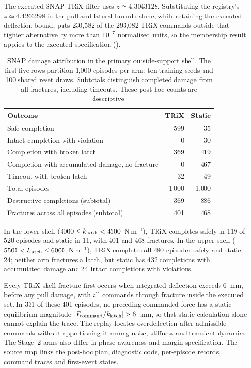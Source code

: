 \documentclass[10pt]{article}
\let\suppsection\suppname
\begin{document}
The executed SNAP TRiX filter uses $z\simeq4.3043128$. Substituting the
registry's $z\simeq4.4266298$ in the pull and lateral bounds alone, while
retaining the executed deflection bound, puts 230,582 of the 293,082 TRiX
commands outside that tighter alternative by more than $10^{-7}$ normalized
units, so the membership result applies to the executed specification (\suppsection{S5.7}).

\begin{table}[!htbp]
\centering\small
\caption{SNAP damage attribution in the primary outside-support shell.
The first five rows partition 1,000 episodes per arm: ten training seeds
and 100 shared reset draws. Subtotals distinguish completed damage from
all fractures, including timeouts. These post-hoc counts are descriptive.}
\label{tab:snap-ood-attribution}
\begin{tabular}{@{}lrr@{}}
\toprule Outcome & TRiX & Static\\
\midrule
Safe completion & 599 & 35\\
Intact completion with violation & 0 & 30\\
Completion with broken latch & 369 & 419\\
Completion with accumulated damage, no fracture & 0 & 467\\
Timeout with broken latch & 32 & 49\\
\midrule
Total episodes & 1,000 & 1,000\\
\midrule
Destructive completions (subtotal) & 369 & 886\\
Fractures across all episodes (subtotal) & 401 & 468\\
\bottomrule
\end{tabular}
\end{table}

In the lower shell ($4000\leq k_{\rm latch}<4500$~N\,m$^{-1}$), TRiX completes
safely in 119 of 520 episodes and static in 11, with 401 and 468 fractures.
In the upper shell ($5500<k_{\rm latch}\leq6000$~N\,m$^{-1}$),
TRiX completes all 480 episodes safely and static 24; neither arm
fractures a latch, but static has 432 completions with accumulated damage and
24 intact completions with violations.

Every TRiX shell fracture first occurs when integrated deflection exceeds
6~mm, before any pull damage, with all commands through fracture inside the
executed set. In 331 of these 401 episodes, no
preceding commanded force has a static equilibrium magnitude
$|F_{\rm command}/k_{\rm latch}|>6$~mm, so that static calculation alone cannot
explain the trace. The replay locates overdeflection after admissible commands
without apportioning it among noise, stiffness and transient dynamics. The Stage~2 arms also differ in phase awareness and margin
specification. The source map links the post-hoc plan, diagnostic code,
per-episode records, command traces and first-event states.
\end{document}
